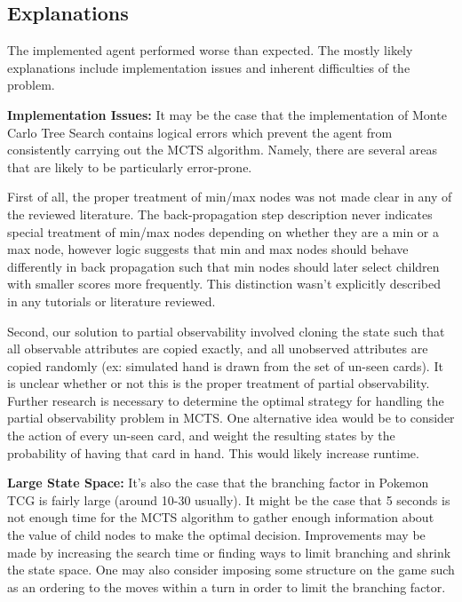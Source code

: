 \documentclass{article}
\begin{document}
\subsection{Explanations} %

The implemented agent performed worse than expected. The mostly likely explanations include implementation issues and inherent difficulties of the problem. 

\textbf{Implementation Issues: } It may be the case that the implementation of Monte Carlo Tree Search contains logical errors which prevent the agent from consistently carrying out the MCTS algorithm. Namely, there are several areas that are likely to be particularly error-prone. 

First of all, the proper treatment of min/max nodes was not made clear in any of the reviewed literature. The back-propagation step description never indicates special treatment of min/max nodes depending on whether they are a min or a max node, however logic suggests that min and max nodes should behave differently in back propagation such that min nodes should later select children with smaller scores more frequently. This distinction wasn't explicitly described in any tutorials or literature reviewed. 

Second, our solution to partial observability involved cloning the state such that all observable attributes are copied exactly, and all unobserved attributes are copied randomly (ex: simulated hand is drawn from the set of un-seen cards). It is unclear whether or not this is the proper treatment of partial observability.  Further research is necessary to determine the optimal strategy for handling the partial observability problem in MCTS.  One alternative idea would be to consider the action of every un-seen card, and weight the resulting states by the probability of having that card in hand.  This would likely increase runtime.

\textbf{Large State Space: } It's also the case that the branching factor in Pokemon TCG is fairly large (around 10-30 usually). It might be the case that 5 seconds is not enough time for the MCTS algorithm to gather enough information about the value of child nodes to make the optimal decision. Improvements may be made by increasing the search time or finding ways to limit branching and shrink the state space. One may also consider imposing some structure on the game such as an ordering to the moves within a turn in order to limit the branching factor.
\end{document}
